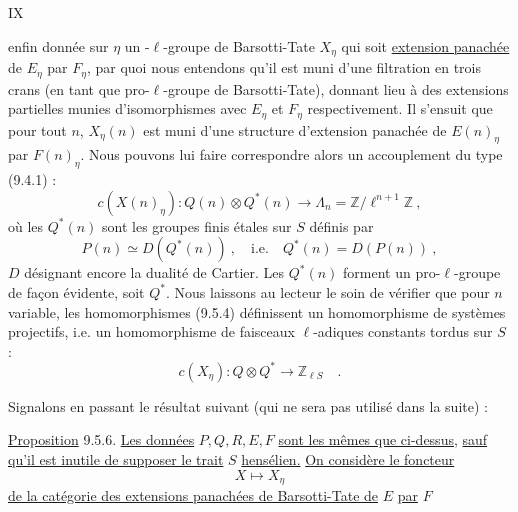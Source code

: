 \hfill IX

enfin donnée sur $\eta$ un -$\ell$-groupe de Barsotti-Tate $X_\eta$ qui soit \uline{extension panachée} de $E_\eta$ par $F_\eta$, par quoi nous entendons qu'il est muni d'une filtration en trois crans (en tant que pro-$\ell$-groupe de Barsotti-Tate), donnant lieu à des extensions partielles munies d'isomorphismes avec $E_\eta$ et $F_\eta$ respectivement. Il s'ensuit que pour tout $n$, $X_\eta(n)$ est muni d'une structure d'extension panachée de $E(n)_\eta$ par $F(n)_\eta$. Nous pouvons lui faire correspondre alors un accouplement du type (9.4.1) :
\[
 c(X(n)_\eta):Q(n)\otimes Q^*(n)\longrightarrow\Lambda_n=\mathbb Z/\ell^{n+1}\mathbb Z\ ,\tag*{(9.5.4)}
\]
où les $Q^*(n)$ sont les groupes finis étales sur $S$ définis par
\[
 P(n)\simeq D(Q^*(n))\ ,\quad\text{i.e.}\quad Q^*(n)=D(P(n))\ ,
\]
$D$ désignant encore la dualité de Cartier. Les $Q^*(n)$ forment un pro-$\ell$-groupe de façon évidente, soit $Q^*$. Nous laissons au lecteur le soin de vérifier que pour $n$ variable, les homomorphismes (9.5.4) définissent un homomorphisme de systèmes projectifs, i.e. un homomorphisme de faisceaux $\ell$-adiques constants tordus sur $S$ :
\[
 c(X_\eta):Q\otimes Q^*\longrightarrow\mathbb Z_{\ell S}\quad . \tag*{(9.5.5)}
\]

Signalons en passant le résultat suivant (qui ne sera pas utilisé dans la suite) :

\uline{Proposition} 9.5.6. \uline{Les données} $P,Q,R,E,F$ \uline{sont les mêmes que ci-dessus}, \uline{sauf qu'il est inutile de supposer le trait} $S$ \uline{hensélien.} \uline{On considère le foncteur}
\[
 X\longmapsto X_\eta \tag*{(9.5.6.1)}
\]
\uline{de la catégorie des extensions panachées de Barsotti-Tate de} $E$ \uline{par} $F$
